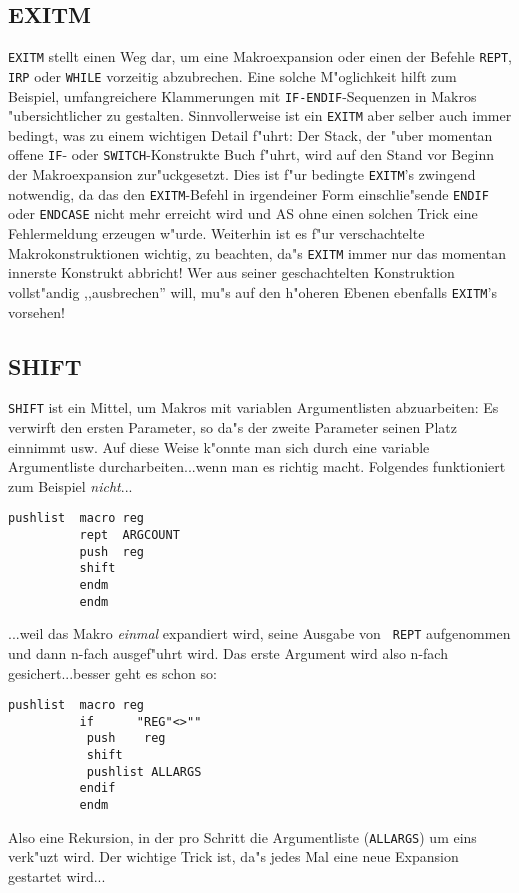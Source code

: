 \documentclass[12pt,a4paper,twoside]{report}
\makeatletter
\newcommand{\tty}[1]{{\tt #1}}
\newcommand{\ttindex}[1]{\index{#1@{\tt #1}}}
\makeatother
\begin{document}
{%

\subsection{EXITM}
\ttindex{EXITM}

\tty{EXITM} stellt einen Weg dar, um eine Makroexpansion oder einen der
Befehle \tty{REPT}, \tty{IRP} oder \tty{WHILE} vorzeitig abzubrechen.  
Eine solche M"oglichkeit hilft zum Beispiel, umfangreichere Klammerungen 
mit \tty{IF-ENDIF}-Sequenzen in Makros "ubersichtlicher zu gestalten.  
Sinnvollerweise ist ein \tty{EXITM} aber selber auch immer bedingt, was zu
einem wichtigen Detail f"uhrt: Der Stack, der "uber momentan offene
\tty{IF}- oder \tty{SWITCH}-Konstrukte Buch f"uhrt, wird auf den Stand vor
Beginn der Makroexpansion zur"uckgesetzt.  Dies ist f"ur bedingte
\tty{EXITM}'s zwingend notwendig, da das den \tty{EXITM}-Befehl in 
irgendeiner Form einschlie"sende \tty{ENDIF} oder \tty{ENDCASE} nicht mehr 
erreicht wird und AS ohne einen solchen Trick eine Fehlermeldung erzeugen 
w"urde.  Weiterhin ist es f"ur verschachtelte Makrokonstruktionen 
wichtig, zu beachten, da"s \tty{EXITM} immer nur das momentan innerste
Konstrukt abbricht!  Wer aus seiner geschachtelten Konstruktion
vollst"andig ,,ausbrechen'' will, mu"s auf den h"oheren Ebenen ebenfalls 
\tty{EXITM}'s vorsehen!


\subsection{SHIFT}
\ttindex{SHIFT}

{\tt SHIFT} ist ein Mittel, um Makros mit variablen Argumentlisten
abzuarbeiten: Es verwirft den ersten Parameter, so da"s der zweite
Parameter seinen Platz einnimmt usw.  Auf diese Weise k"onnte man
sich durch eine variable Argumentliste durcharbeiten...wenn man es richtig
macht.  Folgendes funktioniert zum Beispiel {\em nicht}...
\begin{verbatim}
pushlist  macro reg
          rept  ARGCOUNT
          push  reg
          shift
          endm
          endm
\end{verbatim}
...weil das Makro {\em einmal} expandiert wird, seine Ausgabe von {\tt
REPT} aufgenommen und dann n-fach ausgef"uhrt wird.  Das erste Argument
wird also n-fach gesichert...besser geht es schon so:
\begin{verbatim}
pushlist  macro reg
          if      "REG"<>""
           push    reg
           shift
           pushlist ALLARGS
          endif
          endm
\end{verbatim}
Also eine Rekursion, in der pro Schritt die Argumentliste ({\tt ALLARGS})
um eins verk"uzt wird.  Der wichtige Trick ist, da"s jedes Mal eine neue
Expansion gestartet wird...

}
\end{document}
